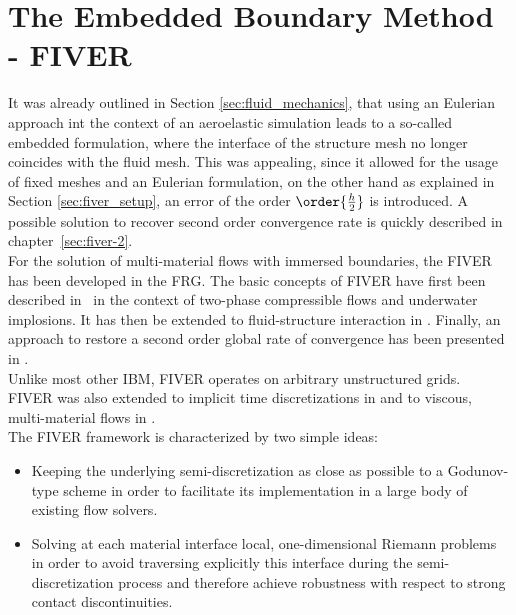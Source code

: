 \documentclass[../main.tex]{subfiles}
\begin{document}
\setlength{\delimitershortfall}{0pt}
\chapter{The Embedded Boundary Method - FIVER}\label{sec:embedded_boundary_method}
\minitoc


It was already outlined in Section \ref{sec:fluid_mechanics}, that using an Eulerian approach int the context of an aeroelastic simulation leads to a so-called embedded formulation, where the interface of the structure mesh no longer coincides with the fluid mesh. This was appealing, since it allowed for the usage of fixed meshes and an Eulerian formulation, on the other hand as  explained in Section \ref{sec:fiver_setup}, an error of the order $\order{\frac{h}{2}}$ is introduced. A possible solution to recover second order convergence rate is quickly described in chapter~\ref{sec:fiver-2}.\\
For the solution of multi-material flows with immersed boundaries, the \acf{FIVER} has been developed in the \acf{FRG}. The basic concepts of \ac{FIVER} have first been described in~\cite{Farhat2008} in the context of two-phase compressible flows and underwater implosions. It has then be extended to fluid-structure interaction in \cite{Wang2011a}. Finally, an approach to restore a second order global rate of convergence has been presented in \cite{Main2014}.\\
Unlike most other \ac{IBM}, \ac{FIVER} operates on arbitrary unstructured grids.\\
\ac{FIVER} was also extended to implicit time discretizations in \cite{Main2014a} and to viscous, multi-material flows in \cite{Farhat2014}.\\
The \ac{FIVER} framework is characterized by two simple ideas:
\begin{itemize}
\item Keeping the underlying semi-discretization as close as possible to a Godunov-type scheme in order to facilitate its implementation in a large body of existing flow solvers.
\item Solving at each material interface local, one-dimensional Riemann problems in order to avoid traversing explicitly this interface during the semi-discretization process and therefore achieve robustness with respect to strong contact discontinuities.
\end{itemize}
\end{document}
